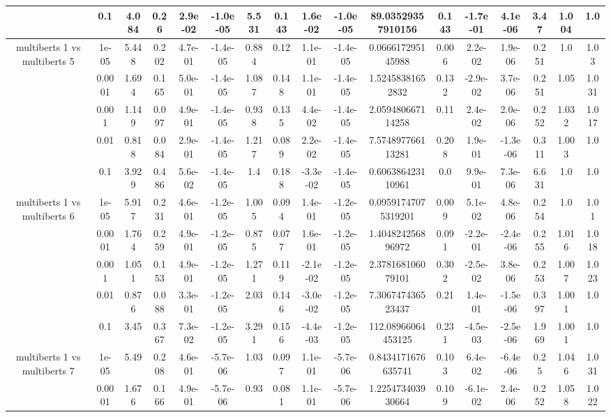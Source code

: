 \begin{tabular}{|c|c|c|c|c|c|c|c|c|c|c|c|c|c|c|c|c|}
 & 0.1 & 4.084 & 0.26 & 2.9e-02 & -1.0e-05 & 5.531 & 0.143 & 1.6e-02 & -1.0e-05 & 89.03529357910156 & 0.143 & -1.7e-01 & 4.1e-06 & 3.47 & 1.004 & 1.0 \\
\hline
\multirow{5}{*}{multiberts 1 vs multiberts 5} & 1e-05 & 5.448 & 0.202 & 4.7e-01 & -1.4e-05 & 0.884 & 0.12 & 1.1e-01 & -1.4e-05 & 0.066617295145988 & 0.006 & 2.2e-02 & 1.9e-06 & 0.251 & 1.0 & 1.03 \\
 & 0.0001 & 1.694 & 0.165 & 5.0e-01 & -1.4e-05 & 1.087 & 0.148 & 1.1e-01 & -1.4e-05 & 1.52458381652832 & 0.132 & -2.9e-02 & 3.7e-06 & 0.251 & 1.05 & 1.031 \\
 & 0.001 & 1.149 & 0.097 & 4.9e-01 & -1.4e-05 & 0.938 & 0.135 & 4.4e-02 & -1.4e-05 & 2.059480667114258 & 0.11 & 2.4e-02 & 2.0e-06 & 0.252 & 1.032 & 1.017 \\
 & 0.01 & 0.818 & 0.084 & 2.9e-01 & -1.4e-05 & 1.217 & 0.089 & 2.2e-02 & -1.4e-05 & 7.574897766113281 & 0.208 & 1.9e-01 & -1.3e-06 & 0.311 & 1.003 & 1.0 \\
 & 0.1 & 3.929 & 0.486 & 5.6e-02 & -1.4e-05 & 1.4 & 0.188 & -3.3e-02 & -1.4e-05 & 0.606386423110961 & 0.0 & 9.9e-01 & 7.3e-06 & 6.631 & 1.0 & 1.0 \\
\hline
\multirow{5}{*}{multiberts 1 vs multiberts 6} & 1e-05 & 5.917 & 0.231 & 4.6e-01 & -1.2e-05 & 1.005 & 0.094 & 1.4e-01 & -1.2e-05 & 0.09591747075319201 & 0.009 & 5.1e-02 & 4.8e-06 & 0.254 & 1.0 & 1.01 \\
 & 0.0001 & 1.764 & 0.259 & 4.9e-01 & -1.2e-05 & 0.875 & 0.077 & 1.6e-01 & -1.2e-05 & 1.404824256896972 & 0.091 & -2.2e-01 & -2.4e-06 & 0.255 & 1.016 & 1.018 \\
 & 0.001 & 1.051 & 0.153 & 4.9e-01 & -1.2e-05 & 1.271 & 0.119 & -2.1e-02 & -1.2e-05 & 2.378168106079101 & 0.302 & -2.5e-02 & 3.8e-06 & 0.253 & 1.007 & 1.023 \\
 & 0.01 & 0.876 & 0.088 & 3.3e-01 & -1.2e-05 & 2.03 & 0.146 & -3.0e-02 & -1.2e-05 & 7.306747436523437 & 0.21 & 1.4e-01 & -1.5e-06 & 0.397 & 1.001 & 1.0 \\
 & 0.1 & 3.45 & 0.367 & 7.3e-02 & -1.2e-05 & 3.291 & 0.156 & -4.4e-03 & -1.2e-05 & 112.08966064453125 & 0.231 & -4.5e-03 & -2.5e-06 & 1.969 & 1.001 & 1.0 \\
\hline
\multirow{5}{*}{multiberts 1 vs multiberts 7} & 1e-05 & 5.49 & 0.208 & 4.6e-01 & -5.7e-06 & 1.03 & 0.097 & 1.1e-01 & -5.7e-06 & 0.8434171676635741 & 0.103 & 6.4e-02 & -6.4e-06 & 0.25 & 1.046 & 1.031 \\
 & 0.0001 & 1.676 & 0.166 & 4.9e-01 & -5.7e-06 & 0.93 & 0.081 & 1.1e-01 & -5.7e-06 & 1.225473403930664 & 0.109 & -6.1e-02 & 2.4e-06 & 0.252 & 1.058 & 1.022 \\

\end{tabular}
